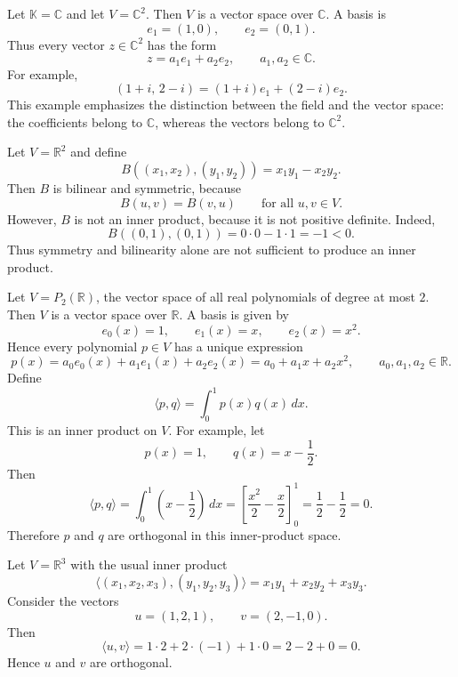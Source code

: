 \documentclass{article}
\begin{document}
	\begin{example}
		Let $\mathbb{K}=\mathbb{C}$ and let $V=\mathbb{C}^2$. Then $V$ is a vector space over $\mathbb{C}$. A basis is
		$$
		e_1=(1,0),\qquad e_2=(0,1).
		$$
		Thus every vector $z\in \mathbb{C}^2$ has the form
		$$
		z=a_1e_1+a_2e_2,
		\qquad a_1,a_2\in\mathbb{C}.
		$$
		For example,
		$$
		(1+i,\,2-i)=(1+i)e_1+(2-i)e_2.
		$$
		This example emphasizes the distinction between the field and the vector space: the coefficients belong to $\mathbb{C}$, whereas the vectors belong to $\mathbb{C}^2$.
	\end{example}
	
	\begin{example}
		Let $V=\mathbb{R}^2$ and define
		$$
		B((x_1,x_2),(y_1,y_2))=x_1y_1-x_2y_2.
		$$
		Then $B$ is bilinear and symmetric, because
		$$
		B(u,v)=B(v,u)
		\qquad \text{for all }u,v\in V.
		$$
		However, $B$ is not an inner product, because it is not positive definite. Indeed,
		$$
		B((0,1),(0,1))=0\cdot 0-1\cdot 1=-1<0.
		$$
		Thus symmetry and bilinearity alone are not sufficient to produce an inner product.
	\end{example}
	
	\begin{example}
		Let $V=P_2(\mathbb{R})$, the vector space of all real polynomials of degree at most $2$. Then $V$ is a vector space over $\mathbb{R}$. A basis is given by
		$$
		e_0(x)=1,\qquad e_1(x)=x,\qquad e_2(x)=x^2.
		$$
		Hence every polynomial $p\in V$ has a unique expression
		$$
		p(x)=a_0e_0(x)+a_1e_1(x)+a_2e_2(x)
		=a_0+a_1x+a_2x^2,
		\qquad a_0,a_1,a_2\in\mathbb{R}.
		$$
		Define
		$$
		\langle p,q\rangle=\int_{0}^{1} p(x)q(x)\,dx.
		$$
		This is an inner product on $V$. For example, let
		$$
		p(x)=1,\qquad q(x)=x-\frac12.
		$$
		Then
		$$
		\langle p,q\rangle=\int_0^1 \left(x-\frac12\right)\,dx
		=\left[\frac{x^2}{2}-\frac{x}{2}\right]_0^1
		=\frac12-\frac12=0.
		$$
		Therefore $p$ and $q$ are orthogonal in this inner-product space.
	\end{example}
	
	\begin{example}
		Let $V=\mathbb{R}^3$ with the usual inner product
		$$
		\langle (x_1,x_2,x_3),(y_1,y_2,y_3)\rangle=x_1y_1+x_2y_2+x_3y_3.
		$$
		Consider the vectors
		$$
		u=(1,2,1),\qquad v=(2,-1,0).
		$$
		Then
		$$
		\langle u,v\rangle=1\cdot 2+2\cdot(-1)+1\cdot 0=2-2+0=0.
		$$
		Hence $u$ and $v$ are orthogonal.
	\end{example}
	
\end{document}
